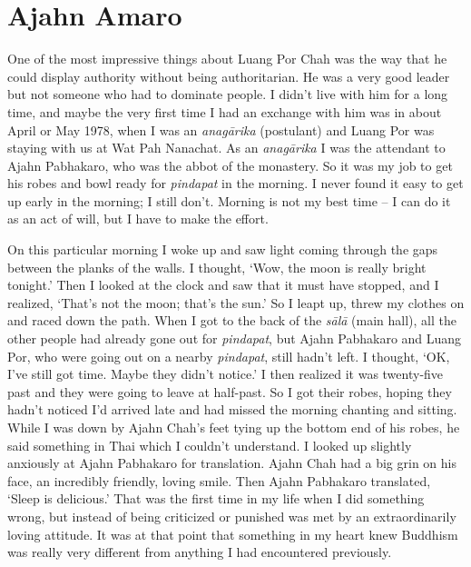 \section{Ajahn Amaro}

One of the most impressive things about Luang Por Chah was the way that
he could display authority without being authoritarian. He was a very
good leader but not someone who had to dominate people. I didn't live
with him for a long time, and maybe the very first time I had an
exchange with him was in about April or May 1978, when I was an
\emph{anagārika} (postulant) and Luang Por was staying with us at Wat
Pah Nanachat. As an \emph{anagārika} I was the attendant to Ajahn
Pabhakaro, who was the abbot of the monastery. So it was my job to get
his robes and bowl ready for \emph{pindapat} in the morning. I never
found it easy to get up early in the morning; I still don't. Morning is
not my best time -- I can do it as an act of will, but I have to make
the effort.

On this particular morning I woke up and saw light coming through the
gaps between the planks of the walls. I thought, `Wow, the moon is
really bright tonight.' Then I looked at the clock and saw that it must
have stopped, and I realized, `That's not the moon; that's the sun.' So
I leapt up, threw my clothes on and raced down the path. When I got to
the back of the \emph{sālā} (main hall), all the other people had
already gone out for \emph{pindapat}, but Ajahn Pabhakaro and Luang Por,
who were going out on a nearby \emph{pindapat}, still hadn't left. I
thought, `OK, I've still got time. Maybe they didn't notice.' I then
realized it was twenty-five past and they were going to leave at
half-past. So I got their robes, hoping they hadn't noticed I'd arrived
late and had missed the morning chanting and sitting. While I was down
by Ajahn Chah's feet tying up the bottom end of his robes, he said
something in Thai which I couldn't understand. I looked up slightly
anxiously at Ajahn Pabhakaro for translation. Ajahn Chah had a big grin
on his face, an incredibly friendly, loving smile. Then Ajahn Pabhakaro
translated, `Sleep is delicious.' That was the first time in my life
when I did something wrong, but instead of being criticized or punished
was met by an extraordinarily loving attitude. It was at that point that
something in my heart knew Buddhism was really very different from
anything I had encountered previously.

